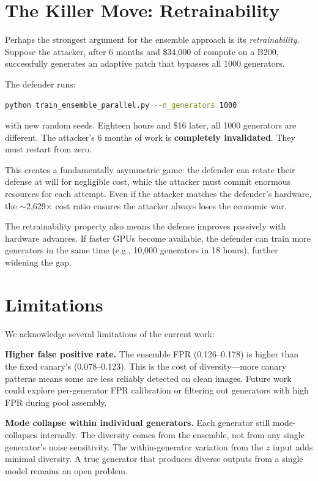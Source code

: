\documentclass[11pt,a4paper]{article}
\begin{document}
\section{The Killer Move: Retrainability}

Perhaps the strongest argument for the ensemble approach is its \textit{retrainability}. Suppose the attacker, after 6 months and \$34,000 of compute on a B200, successfully generates an adaptive patch that bypasses all 1000 generators.

The defender runs:
\begin{lstlisting}[language=bash]
python train_ensemble_parallel.py --n_generators 1000
\end{lstlisting}
with new random seeds. Eighteen hours and \$16 later, all 1000 generators are different. The attacker's 6 months of work is \textbf{completely invalidated}. They must restart from zero.

This creates a fundamentally asymmetric game: the defender can rotate their defense at will for negligible cost, while the attacker must commit enormous resources for each attempt. Even if the attacker matches the defender's hardware, the $\sim$2,629$\times$ cost ratio ensures the attacker always loses the economic war.

The retrainability property also means the defense improves passively with hardware advances. If faster GPUs become available, the defender can train more generators in the same time (e.g., 10,000 generators in 18 hours), further widening the gap.

\section{Limitations}

We acknowledge several limitations of the current work:

\textbf{Higher false positive rate.} The ensemble FPR (0.126--0.178) is higher than the fixed canary's (0.078--0.123). This is the cost of diversity---more canary patterns means some are less reliably detected on clean images. Future work could explore per-generator FPR calibration or filtering out generators with high FPR during pool assembly.

\textbf{Mode collapse within individual generators.} Each generator still mode-collapses internally. The diversity comes from the ensemble, not from any single generator's noise sensitivity. The within-generator variation from the $z$ input adds minimal diversity. A true generator that produces diverse outputs from a single model remains an open problem.
\end{document}
